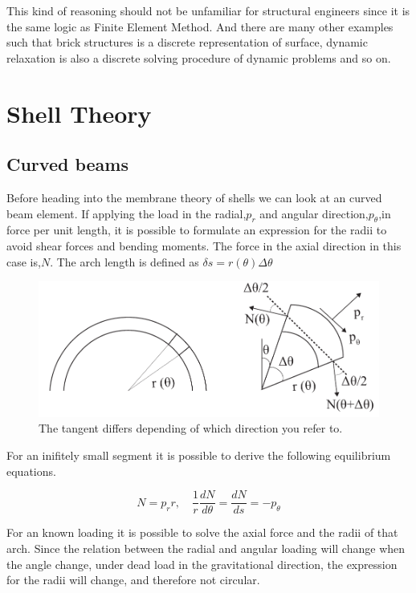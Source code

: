 This kind of reasoning should not be unfamiliar for structural engineers since it is the same logic as Finite Element Method. And there are many other examples such that brick structures is a discrete representation of surface, dynamic relaxation is also a discrete solving procedure of dynamic problems and so on. 

\section{Shell Theory}




\subsection{Curved beams}

Before heading into the membrane theory of shells we can look at an curved beam element. If applying the load in the radial,$p_r$ and angular direction,$p_\theta$,in force per unit length, it is possible to formulate an expression for the radii to avoid shear forces and bending moments. The force in the axial direction in this case is,$N$. The arch length is defined as $\delta s = r(\theta)\Delta\theta $

\begin{figure}[H]
\centering
\includegraphics[width=0.9\linewidth ]{figure/Theory/CurvedBeam3.pdf}
\caption{The tangent differs depending of which direction you refer to. }
\end{figure}

For an inifitely small segment it is possible to derive the following equilibrium equations.

\begin{equation}
N = p_r r,\quad \frac{1}{r} \frac{dN}{d\theta} = \frac{dN}{ds} = - p_\theta
\end{equation}

For an known loading it is possible to solve the axial force and the radii of that arch. Since the relation between the radial and angular loading will change when the angle change, under dead load in the gravitational direction, the expression for the radii will change, and therefore not circular. 

